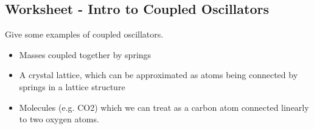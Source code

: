 \subsection{Worksheet - Intro to Coupled Oscillators}
\begin{p}
Give some examples of coupled oscillators.
\end{p}
\begin{s}
\phantom{i}
\begin{itemize}
    \item Masses coupled together by springs
    \item A crystal lattice, which can be approximated as atoms being connected by springs in a lattice structure
    \item Molecules (e.g. CO2) which we can treat as a carbon atom connected linearly to two oxygen atoms.
\end{itemize}
\end{s}


